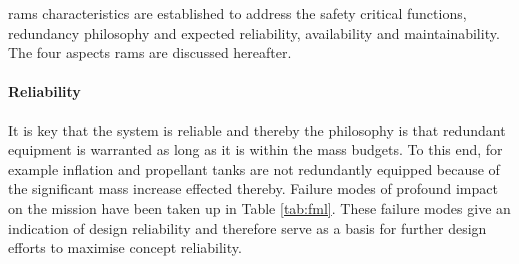 \gls{rams} characteristics are established to address the safety critical functions, redundancy philosophy and expected reliability, availability and maintainability. The four aspects \gls{rams} are discussed hereafter.

\paragraph{Reliability}
It is key that the system is reliable and thereby the philosophy is that redundant equipment is warranted as long as it is within the mass budgets. To this end, for example inflation and propellant tanks are not redundantly equipped because of the significant mass increase effected thereby. Failure modes of profound impact on the mission have been taken up in Table \ref{tab:fml}. These failure modes give an indication of design reliability and therefore serve as a basis for further design efforts to maximise concept reliability.

